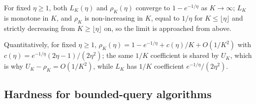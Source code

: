\begin{corollary}[Limit in $K$]\label{cor:limit}
For fixed $\eta\ge1$, both $L_K(\eta)$ and $\rho_K(\eta)$ converge to
$1-e^{-1/\eta}$ as $K\to\infty$; $L_K$ is monotone in $K$, and
$\rho_K$ is non-increasing in $K$, equal to $1/\eta$ for
$K\le\lfloor\eta\rfloor$ and strictly decreasing from
$K\ge\lfloor\eta\rfloor$ on, so the limit is approached from above.
\end{corollary}
Quantitatively, for fixed $\eta\ge1$,
$\rho_K(\eta)=1-e^{-1/\eta}+c(\eta)/K+O(1/K^{2})$ with
$c(\eta)=e^{-1/\eta}(2\eta-1)/(2\eta^{2})$; the same $1/K$ coefficient is
shared by $U_K$, which is why $U_K-\rho_K=O(1/K^{2})$, while $L_K$ has
$1/K$ coefficient $e^{-1/\eta}/(2\eta^{2})$.

\subsection{Hardness for bounded-query algorithms}\label{sec:hardness}

